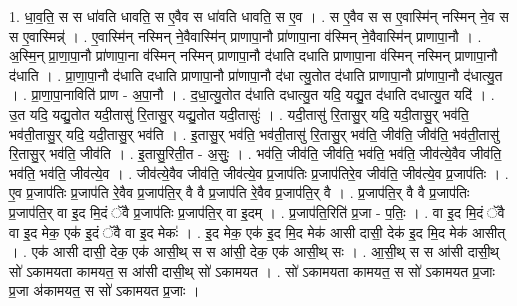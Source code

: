 \documentclass[17pt]{extarticle}
\begin{document}
1. धा॒व॒ति॒ स स धा॑वति धावति॒ स ए॒वैव स धा॑वति धावति॒ स ए॒व । . स ए॒वैव स स ए॒वास्मि॑न् नस्मिन् ने॒व स स ए॒वास्मिन्न्॑ । . ए॒वास्मि॑न् नस्मिन् ने॒वैवास्मि॑न् प्राणापा॒नौ प्रा॑णापा॒ना व॑स्मिन् ने॒वैवास्मि॑न् प्राणापा॒नौ । . अ॒स्मि॒न् प्रा॒णा॒पा॒नौ प्रा॑णापा॒ना व॑स्मिन् नस्मिन् प्राणापा॒नौ द॑धाति दधाति प्राणापा॒ना व॑स्मिन् नस्मिन् प्राणापा॒नौ द॑धाति । . प्रा॒णा॒पा॒नौ द॑धाति दधाति प्राणापा॒नौ प्रा॑णापा॒नौ द॑धा त्यु॒तोत द॑धाति प्राणापा॒नौ प्रा॑णापा॒नौ द॑धात्यु॒त । . प्रा॒णा॒पा॒नाविति॑ प्राण - अ॒पा॒नौ । . द॒धा॒त्यु॒तोत द॑धाति दधात्यु॒त यदि॒ यद्यु॒त द॑धाति दधात्यु॒त यदि॑ । . उ॒त यदि॒ यद्यु॒तोत यदी॒तासु॑ रि॒तासु॒र् यद्यु॒तोत यदी॒तासुः॑ । . यदी॒तासु॑ रि॒तासु॒र् यदि॒ यदी॒तासु॒र् भव॑ति॒ भव॑ती॒तासु॒र् यदि॒ यदी॒तासु॒र् भव॑ति । . इ॒तासु॒र् भव॑ति॒ भव॑ती॒तासु॑ रि॒तासु॒र् भव॑ति॒ जीव॑ति॒ जीव॑ति॒ भव॑ती॒तासु॑ रि॒तासु॒र् भव॑ति॒ जीव॑ति । . इ॒तासु॒रिती॒त - अ॒सुः॒ । . भव॑ति॒ जीव॑ति॒ जीव॑ति॒ भव॑ति॒ भव॑ति॒ जीव॑त्ये॒वैव जीव॑ति॒ भव॑ति॒ भव॑ति॒ जीव॑त्ये॒व । . जीव॑त्ये॒वैव जीव॑ति॒ जीव॑त्ये॒व प्र॒जाप॑तिः प्र॒जाप॑तिरे॒व जीव॑ति॒ जीव॑त्ये॒व प्र॒जाप॑तिः । . ए॒व प्र॒जाप॑तिः प्र॒जाप॑ति रे॒वैव प्र॒जाप॑ति॒र् वै वै प्र॒जाप॑ति रे॒वैव प्र॒जाप॑ति॒र् वै । . प्र॒जाप॑ति॒र् वै वै प्र॒जाप॑तिः प्र॒जाप॑ति॒र् वा इ॒द मि॒दं ॅवै प्र॒जाप॑तिः प्र॒जाप॑ति॒र् वा इ॒दम् । . प्र॒जाप॑ति॒रिति॑ प्र॒जा - प॒तिः॒ । . वा इ॒द मि॒दं ॅवै वा इ॒द मेक॒ एक॑ इ॒दं ॅवै वा इ॒द मेकः॑ । . इ॒द मेक॒ एक॑ इ॒द मि॒द मेक॑ आसी दासी॒ देक॑ इ॒द मि॒द मेक॑ आसीत् । . एक॑ आसी दासी॒ देक॒ एक॑ आसी॒थ् स स आ॑सी॒ देक॒ एक॑ आसी॒थ् सः । . आ॒सी॒थ् स स आ॑सी दासी॒थ् सो॑ ऽकामयता कामयत॒ स आ॑सी दासी॒थ् सो॑ ऽकामयत । . सो॑ ऽकामयता कामयत॒ स सो॑ ऽकामयत प्र॒जाः प्र॒जा अ॑कामयत॒ स सो॑ ऽकामयत प्र॒जाः । \newline
\end{document}
